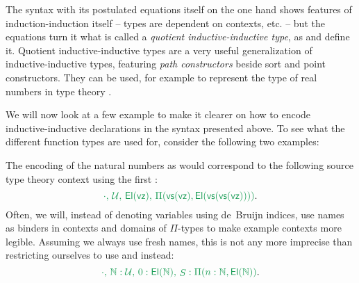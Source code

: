\begin{remark}\label{rmk:iit-qit}
The syntax with its postulated equations itself on the one hand shows features
of induction-induction itself
-- types are dependent on contexts, etc. --
but the equations turn it what is called a \emph{quotient inductive-inductive type},
as \citet{altenkirch2018quotient} and \citet{constructingqiits} define it.
Quotient inductive-inductive types are a very useful generalization of
inductive-inductive types,
featuring \emph{path constructors} beside sort and point constructors.
They can be used, for example
to represent the type of real numbers in type theory \citep{hottbook}.
\end{remark}

We will now look at a few example to make it clearer on how to encode inductive-inductive
declarations in the syntax presented above. %
To see what the different function types are used for, consider the following two
examples:

\begin{example}\label{ex:ii-syntax-nat}
The encoding of the natural numbers as would correspond to the
following source type theory context using the first :
\begin{equation*}
\grm{
\cdot,\, \UU,\, \El(\vz),\, \Pi(\vs(\vz), \El(\vs(\vs(\vz))))
}\text{.}
\end{equation*}
Often, we will, instead of denoting variables using de~Bruijn indices, use names
as binders in contexts and domains of $\Pi$-types to make example contexts more
legible.
Assuming we always use fresh names, this is not any more imprecise than restricting
ourselves to use \grm{\vz} and \grm{\vz} instead:
\begin{equation*}
\grm{
\cdot,\, \N : \UU,\, 0 : \El(\N),\, \mathop{S} : \Pi(n : \N, \El(\N))
}\text{.}
\end{equation*}
\end{example}


